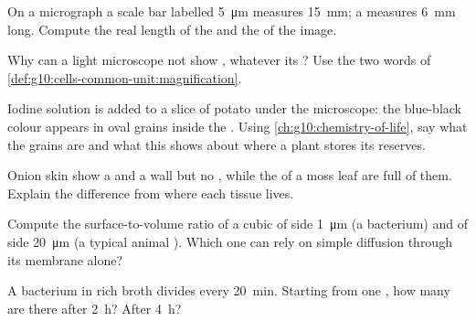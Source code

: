\begin{exercise}[$\star\star$]\label{exo:g10:cells-common-unit:6}
On a micrograph a scale bar labelled \qty{5}{\micro m} measures
\qty{15}{mm}; a  measures \qty{6}{mm} long. Compute the
real length of the  and the  of the image.
\end{exercise}

\begin{exercise}[$\star\star$]\label{exo:g10:cells-common-unit:7}
Why can a light microscope not show , whatever its
? Use the two words of
\cref{def:g10:cells-common-unit:magnification}.
\end{exercise}

\begin{exercise}[$\star\star$]\label{exo:g10:cells-common-unit:8}
Iodine solution is added to a slice of potato under the microscope: the
blue-black colour appears in oval grains inside the . Using
\cref{ch:g10:chemistry-of-life}, say what the grains are and what this
shows about where a plant stores its reserves.
\end{exercise}

\begin{exercise}[$\star\star$]\label{exo:g10:cells-common-unit:9}
Onion skin  show a  and a wall but no , while
the  of a moss leaf are full of them. Explain the difference from
where each tissue lives.
\end{exercise}

\begin{exercise}[$\star\star$]\label{exo:g10:cells-common-unit:10}
Compute the surface-to-volume ratio of a cubic  of side
\qty{1}{\micro m} (a bacterium) and of side \qty{20}{\micro m} (a
typical animal ). Which one can rely on simple diffusion through
its membrane alone?
\end{exercise}

\begin{exercise}[$\star\star$]\label{exo:g10:cells-common-unit:11}
A bacterium in rich broth divides every \qty{20}{min}. Starting from
one , how many are there after \qty{2}{h}? After \qty{4}{h}?
\end{exercise}

